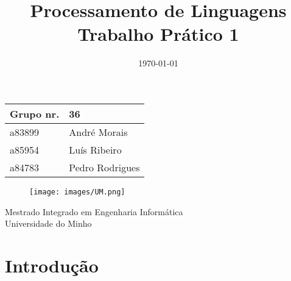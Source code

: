 \documentclass[12pt]{article}
\title{
    \Huge Processamento de Linguagens\\
    \normalsize \textbf{Trabalho Prático 1}
}
\date{\today}
\begin{document}
\begin{titlepage}

    \maketitle
    \begin{center}\large

        \begin{tabular}{ll}
            \textbf{Grupo} nr. & 36
            \\\hline
            a83899 & André Morais
            \\
            a85954 & Luís Ribeiro
            \\
            a84783 & Pedro Rodrigues
        \end{tabular}

    \end{center}

    \vfill

    \begin{figure}[h]
        \centering
        \texttt{[image: images/UM.png]}
    \end{figure}

    \begin{center}
        \large Mestrado Integrado em Engenharia Informática\\
        Universidade do Minho
    \end{center}

\end{titlepage}

\tableofcontents{}

\newpage

\section{Introdução}

\vspace{1cm}
\end{document}
